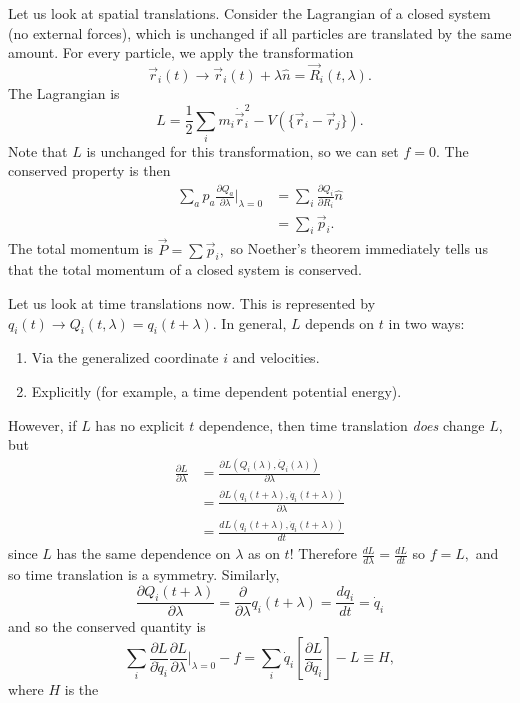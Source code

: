 \documentclass{article}
\numberwithin{equation}{section}
\begin{document}
\begin{example}
    Let us look at spatial translations. Consider the Lagrangian of a closed system (no external forces), which is unchanged if all particles are translated by the same amount. For every particle, we apply the transformation
    \begin{equation}
        \vec{r}_i(t) \to \vec{r}_i(t) + \lambda\hat{n} = \vec{R}_i(t,\lambda).
    \end{equation}
    The Lagrangian is
    \begin{equation}
        L = \frac{1}{2}\sum_i m_i\dot{\vec{r}}_i^2 - V(\{\vec{r}_i-\vec{r}_j\}).
    \end{equation}
    Note that $L$ is unchanged for this transformation, so we can set $f=0$. The conserved property is then
    \begin{align*}
        \sum_a p_a \frac{\partial Q_a}{\partial \lambda}\biggr|_{\lambda = 0} &= \sum_i \frac{\partial Q_i}{\partial R_i}\hat{n} \\
        &= \sum_i \vec{p}_i.
    \end{align*}
    The total momentum is $\vec{P}=\sum \vec{p}_i,$ so Noether's theorem immediately tells us that the total momentum of a closed system is conserved.
\end{example}
\begin{example}
    Let us look at time translations now. This is represented by $q_i(t) \to Q_i(t,\lambda) = q_i(t+\lambda)$. In general, $L$ depends on $t$ in two ways:
    \begin{enumerate}
        \item Via the generalized coordinate $i$ and velocities.
        \item Explicitly (for example, a time dependent potential energy).
    \end{enumerate}
    However, if $L$ has no explicit $t$ dependence, then time translation \textit{does} change $L$, but
    \begin{align*}
        \frac{\partial L}{\partial \lambda} &= \frac{\partial L(Q_i(\lambda),\dot{Q}_i(\lambda))}{\partial \lambda} \\ 
        &= \frac{\partial L(q_i(t+\lambda),\dot{q}_i(t+\lambda))}{\partial \lambda} \\ 
        &= \frac{dL(q_i(t+\lambda),\dot{q}_i(t+\lambda))}{dt}
    \end{align*}
    since $L$ has the same dependence on $\lambda$ as on $t$! Therefore $\frac{dL}{d\lambda}=\frac{dL}{dt}$ so $f=L,$ and so time translation is a symmetry. Similarly,
    \begin{equation}
        \frac{\partial Q_i(t+\lambda)}{\partial \lambda} = \frac{\partial}{\partial \lambda}q_i(t+\lambda) = \frac{dq_i}{dt} = \dot{q}_i
    \end{equation}
    and so the conserved quantity is
    \begin{equation}
        \sum_i \frac{\partial L}{\partial \dot{q}_i}\frac{\partial L}{\partial \lambda}\biggr|_{\lambda=0} - f = \sum_i \dot{q}_i\left[\frac{\partial L}{\partial \dot{q}_i}\right] - L \equiv H,
    \end{equation}
    where $H$ is the 
\end{example}
\end{document}
